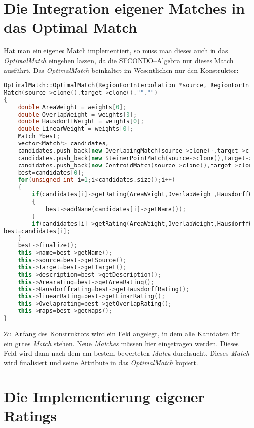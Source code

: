\section{Die Integration eigener Matches in das Optimal Match}

Hat man ein eigenes Match implementiert, so muss man dieses auch in das \textit{OptimalMatch} eingehen lassen, da die SECONDO--Algebra nur dieses Match ausführt. Das \textit{OptimalMatch} beinhaltet im Wesentlichen nur den Konstruktor:
\begin{lstlisting}[language=c++]
OptimalMatch::OptimalMatch(RegionForInterpolation *source, RegionForInterpolation *target,vector<double> weights):
Match(source->clone(),target->clone(),"","")
{	        
	double AreaWeight = weights[0];
	double OverlapWeight = weights[0];
	double HausdorffWeight = weights[0];
	double LinearWeight = weights[0];
	Match *best;
	vector<Match*> candidates;
	candidates.push_back(new OverlapingMatch(source->clone(),target->clone(),0.3,false));
	candidates.push_back(new SteinerPointMatch(source->clone(),target->clone(),0.3,false));
	candidates.push_back(new CentroidMatch(source->clone(),target->clone(),0.3,false));
	best=candidates[0];
	for(unsigned int i=1;i<candidates.size();i++)
	{
		if(candidates[i]->getRating(AreaWeight,OverlapWeight,HausdorffWeight,LinearWeight)==best->getRating(AreaWeight,OverlapWeight,HausdorffWeight,LinearWeight))
		{            	
			best->addName(candidates[i]->getName());
		}
		if(candidates[i]->getRating(AreaWeight,OverlapWeight,HausdorffWeight,LinearWeight)>best->getRating(AreaWeight,OverlapWeight,HausdorffWeight,LinearWeight))
best=candidates[i];
	}
	best->finalize();
	this->name=best->getName();
	this->source=best->getSource();
	this->target=best->getTarget();
	this->description=best->getDescription();
	this->Arearating=best->getAreaRating();
	this->Hausdorffrating=best->getHausdorffRating();
	this->linearRating=best->getLinarRating();
	this->Ovelaprating=best->getOverlapRating();
	this->maps=best->getMaps();
}		
\end{lstlisting}
Zu Anfang des Konstruktors wird ein Feld angelegt, in dem alle Kantdaten für ein gutes \textit{Match} stehen. Neue \textit{Matches} müssen hier eingetragen werden. Dieses Feld wird dann nach dem am bestem bewerteten \textit{Match} durchsucht. Dieses \textit{Match} wird finalisiert und seine Attribute in das \textit{OptimalMatch} kopiert.

\section{Die Implementierung eigener Ratings}

